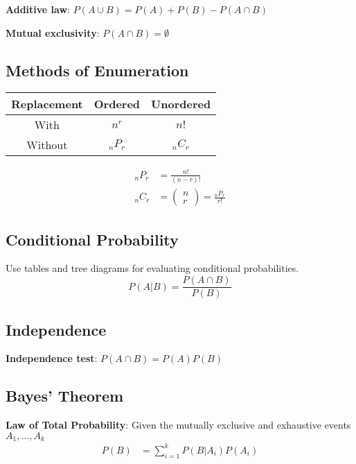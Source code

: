 \documentclass{article}
\begin{document}
\begin{multicols*}{2}
\textbf{Additive law}: $P(A \cup B) = P(A) + P(B) - P(A \cap B)$

\textbf{Mutual exclusivity}: $P(A \cap B) = \emptyset$

\subsection{Methods of Enumeration}

\begin{center}
    \begin{tabular}{|c|c|c|}
        \hline
        Replacement & Ordered    & Unordered  \\ \hline
        With        & $n^r$      & $n!$       \\ \hline
        Without     & ${}_n P_r$ & ${}_n C_r$ \\ \hline
    \end{tabular}
\end{center}
\begin{align*}
    {}_n P_r &= \frac{n!}{(n-r)!} \\
    {}_n C_r &= \begin{pmatrix}
        n \\
        r
    \end{pmatrix} = \frac{{}_n P_r}{r!}
\end{align*}

\subsection{Conditional Probability}
Use tables and tree diagrams for evaluating conditional probabilities.
\begin{equation*}
    P(A|B) = \frac{P(A \cap B)}{P(B)}
\end{equation*}

\subsection{Independence}

\textbf{Independence test}: $P(A \cap B) = P(A) P(B)$

\subsection{Bayes' Theorem}

\textbf{Law of Total Probability}: Given the mutually exclusive and exhaustive events $A_1, \ldots, A_k$
\begin{align*}
    P(B) &= \sum_{i = 1}^k P(B|A_i) P(A_i)
\end{align*}


\end{multicols*}
\end{document}
